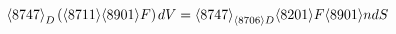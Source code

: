 

    \[\let\par\empty

    
{
{
{{\unicode{8747}}\sb{{
D
}}}
{\left.
\middle(
{\mo{\mathrm{\unicode{8711}\unicode{8901}}}}
F
\middle)
\right.}
d
{
V
}
}
=
{
{{\unicode{8747}}\sb{{
\unicode{8706}
D
}}}
{
{\mathrm{\unicode{8201}}}
F
\unicode{8901}
n
}
d
S
}
}


    \]

  